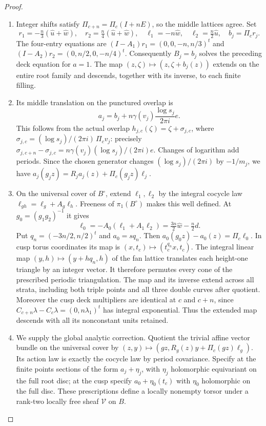 \begin{proof}
\begin{enumerate}[label=\arabic*.,leftmargin=*]
\item Integer shifts satisfy $\Pi_{c+n}=\Pi_c(I+nE)$, so the middle lattices agree. Set
\[
 r_1=-\tfrac n3(\widehat u+\widehat w),\quad
 r_2=\tfrac n4(\widehat u+\widehat w),\quad
 \ell_1=-n\widehat w,\quad \ell_2=\tfrac n2\widehat u,\quad b_j=\Pi_cr_j.
\]
The four-entry equations are $(I-A_1)r_1=(0,0,-n,n/3)^t$ and $(I-A_2)r_2=(0,n/2,0,-n/4)^t$. Consequently $B_j=b_j$ solves the preceding deck equation for $a=1$. The map $(z,\zeta)\mapsto(z,\zeta+b_j(z))$ extends on the entire root family and descends, together with its inverse, to each finite filling.

\item Its middle translation on the punctured overlap is
\[
 a_j=b_j+n\gamma(v_j)\frac{\log s_j}{2\pi i}e.
\]
This follows from the actual overlap $h_{j,c}(\zeta)=\zeta+\sigma_{j,c}$, where $\sigma_{j,c}=(\log s_j)/(2\pi i)\,\Pi_cv_j$: precisely $\sigma_{j,c+n}-\sigma_{j,c}=n\gamma(v_j)(\log s_j)/(2\pi i)e$. Changes of logarithm add periods. Since the chosen generator changes $(\log s_j)/(2\pi i)$ by $-1/m_j$, we have $a_j(g_jz)=R_ja_j(z)+\Pi_c(g_jz)\ell_j$.

\item On the universal cover of $B^\circ$, extend $\ell_1,\ell_2$ by the integral cocycle law $\ell_{gh}=\ell_g+A_g\ell_h$. Freeness of $\pi_1(B^\circ)$ makes this well defined. At $g_0=(g_1g_2)^{-1}$ it gives
\[
 \ell_0=-A_0(\ell_1+A_1\ell_2)=\tfrac{3n}2\widehat w-\tfrac n2d.
\]
Put $q_n=(-3n/2,n/2)^t$ and $a_0=sq_n$. Then $a_0(g_0z)-a_0(z)=\Pi_c\ell_0$. In cusp torus coordinates its map is $(x,t_c)\mapsto(t_c^{q_n}x,t_c)$. The integral linear map $(y,h)\mapsto(y+hq_n,h)$ of the fan lattice translates each height-one triangle by an integer vector. It therefore permutes every cone of the prescribed periodic triangulation. The map and its inverse extend across all strata, including both triple points and all three double curves after quotient. Moreover the cusp deck multipliers are identical at $c$ and $c+n$, since $C_{c+n}\lambda-C_c\lambda=(0,n\lambda_1)^t$ has integral exponential. Thus the extended map descends with all its nonconstant units retained.

\item We supply the global analytic correction. Quotient the trivial affine vector bundle on the universal cover by
$(z,y)\mapsto(gz,R_g(z)y+\Pi_c(gz)\ell_g)$. Its action law is exactly the cocycle law by period covariance. Specify at the finite points sections of the form $a_j+\eta_j$, with $\eta_j$ holomorphic equivariant on the full root disc; at the cusp specify $a_0+\eta_0(t_c)$ with $\eta_0$ holomorphic on the full disc. These prescriptions define a locally nonempty torsor under a rank-two locally free sheaf $\mathcal V$ on $B$.


\end{enumerate}
\end{proof}
